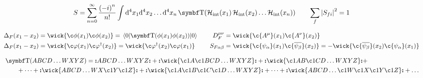 \begin{gather*}
        S = \sum_{n=0}^{\infty}\frac{\qty(-i)^n}{n!}\int\dd[4]x_1\dd[4]x_2\dots\dd[4]x_n\Tordp(\Hc_{\mathrm{int}}(x_1)\Hc_{\mathrm{int}}(x_2)\dots\Hc_{\mathrm{int}}(x_n))
        \qquad
        \sum_f \abs{S_{fi}}^2 = 1
\end{gather*}

\begin{alignat*}{4}
        \Delta_F(x_1-x_2)
        &= \wick{\c\phi(x_1)\c\phi(x_2)}
        =  \mel{0}{\Tordp(\phi(x_1)\phi(x_2))}{0}
        &\quad
        D_F^{\mu\nu}
        &= \wick{\c{A^{\mu}}(x_1)\c{A^\nu}(x_2)}
        \\
        \Delta_F(x_1-x_2)
        &= \wick{\c\varphi(x_1)\c\varphi^\dagger(x_2)}
        =  \wick{\c\varphi^\dagger(x_2)\c\varphi(x_1)}
        &\quad
        S_{F\alpha\beta}
        &= \wick{\c{\psi_\alpha}(x_1)\c{\overline{\psi_\beta}}(x_2)}
        = -\wick{\c{\overline{\psi_\beta}}(x_2) \c{\psi_\alpha}(x_1)}
\end{alignat*}

\begin{align*}
        &\Tordp(ABCD\dots WXYZ)
        = \nord{ABCD\dots WXYZ}
        + \nord{\wick{\c1{A}\c1{B}CD\dots WXYZ}}
        + \nord{\wick{\c1{A}B\c1{C}D\dots WXYZ}}
        +\\&\qquad
        + \dots + \nord{\wick{ABCD\dots WX\c1{Y}\c1{Z}}}
        + \nord{\wick{\c1{A}\c1{B}\c1{C}\c1{D}\dots WXYZ}} + \dots + \nord{\wick{ABCD\dots \c1{W}\c1{X}\c1{Y}\c1{Z}}}
        + \dots
\end{align*}
